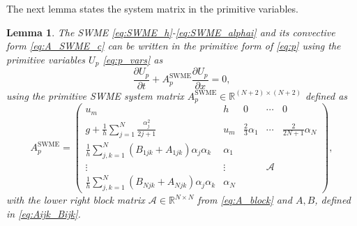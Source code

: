 \documentclass[a4paper, 11pt]{article}
\newtheorem{lemma}{Lemma}
\begin{document}
The next lemma states the system matrix in the primitive variables.
\begin{lemma}\label{lemma:SWME_p}
    The SWME \eqref{eq:SWME_h}-\eqref{eq:SWME_alphai} and its convective form \eqref{eq:A_SWME_c} can be written in the primitive form of \eqref{eq:p} using the primitive variables $U_{p}$ \eqref{eq:p_vars} as
    \begin{equation}\label{eq:SWME_p}
        \frac{\partial U_{p}}{\partial t} + A^{\textrm{SWME}}_{p} \frac{\partial U_{p}}{\partial x} = 0,
    \end{equation}
    using the primitive SWME system matrix $A^{\textrm{SWME}}_{p} \in \mathbb{R}^{(N+2)\times(N+2)}$ defined as
    \begin{equation}\label{eq:A_SWME_p}
        A^{\textrm{SWME}}_{p} =
        \left(\begin{array}{ccccc}
        u_m & h & 0 & \cdots & 0 \\
        g + \frac{1}{h}\sum\limits_{j=1}^{N} \frac{\alpha_j^2}{2j+1} & u_m & \frac{2}{3} \alpha_1 & \cdots & \frac{2}{2 N+1} \alpha_N \\
        \frac{1}{h}\sum\limits_{j,k=1}^{N} \left(B_{1jk} + A_{1jk} \right) \alpha_j \alpha_k & \alpha_1 &  & & \\
        \vdots & \vdots & & \mathcal{A} &  \\
        \frac{1}{h}\sum\limits_{j,k=1}^{N} \left(B_{Njk} + A_{Njk} \right) \alpha_j \alpha_k & \alpha_N &  & &
        \end{array}\right),
    \end{equation}
    with the lower right block matrix $\mathcal{A} \in \mathbb{R}^{N \times N}$ from \eqref{eq:A_block} and $A,B$, defined in \eqref{eq:Aijk_Bijk}.
\end{lemma}
\end{document}
